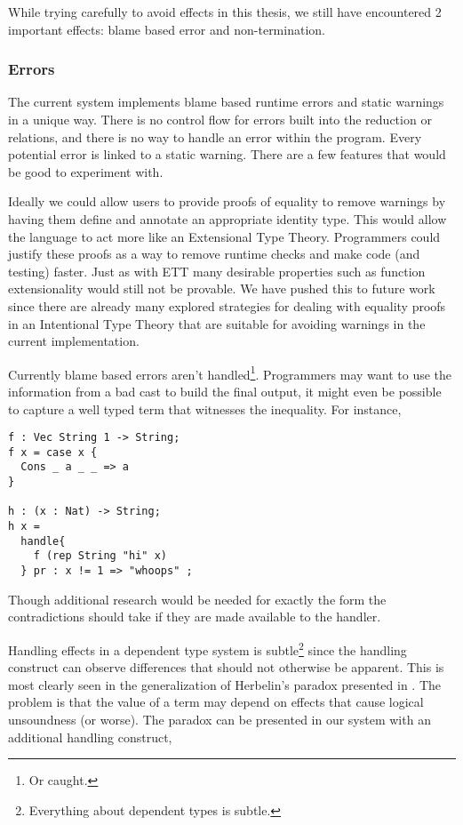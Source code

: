 While trying carefully to avoid effects in this thesis, we still have encountered 2 important effects: blame based error and non-termination.

\subsubsection{Errors}

The current system implements blame based runtime errors and static warnings in a unique way.
There is no control flow for errors built into the reduction or \cbv{} relations, and there is no way to handle an error within the program.
Every potential error is linked to a static warning.
There are a few features that would be good to experiment with.

Ideally we could allow users to provide proofs of equality to remove warnings by having them define and annotate an appropriate identity type.
This would allow the language to act more like an Extensional Type Theory.
Programmers could justify these proofs as a way to remove runtime checks and make code (and testing) faster.
Just as with \ac{ETT} many desirable properties such as function extensionality would still not be provable.
We have pushed this to future work since there are already many explored strategies for dealing with equality proofs in an Intentional Type Theory that are suitable for avoiding warnings in the current implementation.

Currently blame based errors aren't handled\footnote{Or caught.}.
Programmers may want to use the information from a bad cast to build the final output, it might even be possible to capture a well typed term that witnesses the inequality.
For instance,
\begin{lstlisting}
f : Vec String 1 -> String;
f x = case x {
  Cons _ a _ _ => a
}

h : (x : Nat) -> String;
h x =
  handle{
    f (rep String "hi" x)
  } pr : x != 1 => "whoops" ;
\end{lstlisting}

Though additional research would be needed for exactly the form the contradictions should take if they are made available to the handler.

Handling effects in a dependent type system is subtle\footnote{
  Everything about dependent types is subtle.
} since the handling construct can observe differences that should not otherwise be apparent.
This is most clearly seen in the generalization of Herbelin's paradox presented in \cite{10.1145/3371126}.
The problem is that the value of a \Bool{} term may depend on effects that cause logical unsoundness (or worse).
The paradox can be presented in our system with an additional handling construct,


